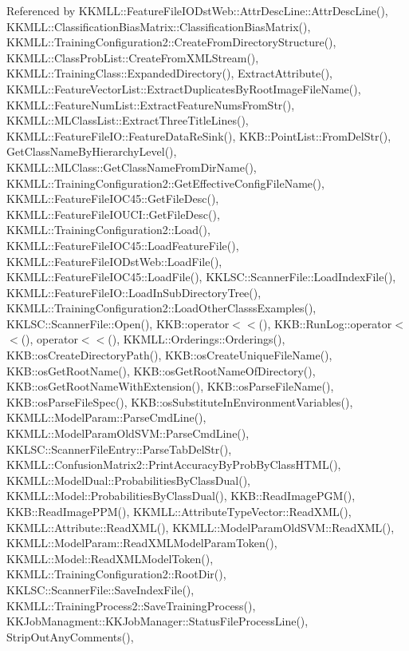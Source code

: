 Referenced by K\+K\+M\+L\+L\+::\+Feature\+File\+I\+O\+Dst\+Web\+::\+Attr\+Desc\+Line\+::\+Attr\+Desc\+Line(), K\+K\+M\+L\+L\+::\+Classification\+Bias\+Matrix\+::\+Classification\+Bias\+Matrix(), K\+K\+M\+L\+L\+::\+Training\+Configuration2\+::\+Create\+From\+Directory\+Structure(), K\+K\+M\+L\+L\+::\+Class\+Prob\+List\+::\+Create\+From\+X\+M\+L\+Stream(), K\+K\+M\+L\+L\+::\+Training\+Class\+::\+Expanded\+Directory(), Extract\+Attribute(), K\+K\+M\+L\+L\+::\+Feature\+Vector\+List\+::\+Extract\+Duplicates\+By\+Root\+Image\+File\+Name(), K\+K\+M\+L\+L\+::\+Feature\+Num\+List\+::\+Extract\+Feature\+Nums\+From\+Str(), K\+K\+M\+L\+L\+::\+M\+L\+Class\+List\+::\+Extract\+Three\+Title\+Lines(), K\+K\+M\+L\+L\+::\+Feature\+File\+I\+O\+::\+Feature\+Data\+Re\+Sink(), K\+K\+B\+::\+Point\+List\+::\+From\+Del\+Str(), Get\+Class\+Name\+By\+Hierarchy\+Level(), K\+K\+M\+L\+L\+::\+M\+L\+Class\+::\+Get\+Class\+Name\+From\+Dir\+Name(), K\+K\+M\+L\+L\+::\+Training\+Configuration2\+::\+Get\+Effective\+Config\+File\+Name(), K\+K\+M\+L\+L\+::\+Feature\+File\+I\+O\+C45\+::\+Get\+File\+Desc(), K\+K\+M\+L\+L\+::\+Feature\+File\+I\+O\+U\+C\+I\+::\+Get\+File\+Desc(), K\+K\+M\+L\+L\+::\+Training\+Configuration2\+::\+Load(), K\+K\+M\+L\+L\+::\+Feature\+File\+I\+O\+C45\+::\+Load\+Feature\+File(), K\+K\+M\+L\+L\+::\+Feature\+File\+I\+O\+Dst\+Web\+::\+Load\+File(), K\+K\+M\+L\+L\+::\+Feature\+File\+I\+O\+C45\+::\+Load\+File(), K\+K\+L\+S\+C\+::\+Scanner\+File\+::\+Load\+Index\+File(), K\+K\+M\+L\+L\+::\+Feature\+File\+I\+O\+::\+Load\+In\+Sub\+Directory\+Tree(), K\+K\+M\+L\+L\+::\+Training\+Configuration2\+::\+Load\+Other\+Classs\+Examples(), K\+K\+L\+S\+C\+::\+Scanner\+File\+::\+Open(), K\+K\+B\+::operator$<$$<$(), K\+K\+B\+::\+Run\+Log\+::operator$<$$<$(), operator$<$$<$(), K\+K\+M\+L\+L\+::\+Orderings\+::\+Orderings(), K\+K\+B\+::os\+Create\+Directory\+Path(), K\+K\+B\+::os\+Create\+Unique\+File\+Name(), K\+K\+B\+::os\+Get\+Root\+Name(), K\+K\+B\+::os\+Get\+Root\+Name\+Of\+Directory(), K\+K\+B\+::os\+Get\+Root\+Name\+With\+Extension(), K\+K\+B\+::os\+Parse\+File\+Name(), K\+K\+B\+::os\+Parse\+File\+Spec(), K\+K\+B\+::os\+Substitute\+In\+Environment\+Variables(), K\+K\+M\+L\+L\+::\+Model\+Param\+::\+Parse\+Cmd\+Line(), K\+K\+M\+L\+L\+::\+Model\+Param\+Old\+S\+V\+M\+::\+Parse\+Cmd\+Line(), K\+K\+L\+S\+C\+::\+Scanner\+File\+Entry\+::\+Parse\+Tab\+Del\+Str(), K\+K\+M\+L\+L\+::\+Confusion\+Matrix2\+::\+Print\+Accuracy\+By\+Prob\+By\+Class\+H\+T\+M\+L(), K\+K\+M\+L\+L\+::\+Model\+Dual\+::\+Probabilities\+By\+Class\+Dual(), K\+K\+M\+L\+L\+::\+Model\+::\+Probabilities\+By\+Class\+Dual(), K\+K\+B\+::\+Read\+Image\+P\+G\+M(), K\+K\+B\+::\+Read\+Image\+P\+P\+M(), K\+K\+M\+L\+L\+::\+Attribute\+Type\+Vector\+::\+Read\+X\+M\+L(), K\+K\+M\+L\+L\+::\+Attribute\+::\+Read\+X\+M\+L(), K\+K\+M\+L\+L\+::\+Model\+Param\+Old\+S\+V\+M\+::\+Read\+X\+M\+L(), K\+K\+M\+L\+L\+::\+Model\+Param\+::\+Read\+X\+M\+L\+Model\+Param\+Token(), K\+K\+M\+L\+L\+::\+Model\+::\+Read\+X\+M\+L\+Model\+Token(), K\+K\+M\+L\+L\+::\+Training\+Configuration2\+::\+Root\+Dir(), K\+K\+L\+S\+C\+::\+Scanner\+File\+::\+Save\+Index\+File(), K\+K\+M\+L\+L\+::\+Training\+Process2\+::\+Save\+Training\+Process(), K\+K\+Job\+Managment\+::\+K\+K\+Job\+Manager\+::\+Status\+File\+Process\+Line(), Strip\+Out\+Any\+Comments(), 